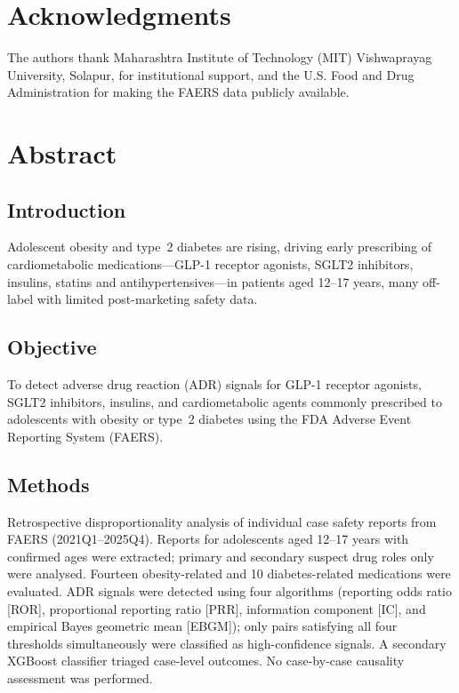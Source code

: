 \documentclass[10pt,a4paper]{article}
\begin{document}
\section*{Acknowledgments}
The authors thank Maharashtra Institute of Technology (MIT) Vishwaprayag University, Solapur, for institutional support, and the U.S. Food and Drug Administration for making the FAERS data publicly available.

\section*{Abstract}

\subsection*{Introduction}
Adolescent obesity and type~2 diabetes are rising, driving early prescribing of cardiometabolic medications---GLP-1 receptor agonists, SGLT2 inhibitors, insulins, statins and antihypertensives---in patients aged 12--17 years, many off-label with limited post-marketing safety data.

\subsection*{Objective}
To detect adverse drug reaction (ADR) signals for GLP-1 receptor agonists, SGLT2 inhibitors, insulins, and cardiometabolic agents commonly prescribed to adolescents with obesity or type~2 diabetes using the FDA Adverse Event Reporting System (FAERS).

\subsection*{Methods}
Retrospective disproportionality analysis of individual case safety reports from FAERS (2021Q1--2025Q4). Reports for adolescents aged 12--17 years with confirmed ages were extracted; primary and secondary suspect drug roles only were analysed. Fourteen obesity-related and 10 diabetes-related medications were evaluated. ADR signals were detected using four algorithms (reporting odds ratio [ROR], proportional reporting ratio [PRR], information component [IC], and empirical Bayes geometric mean [EBGM]); only pairs satisfying all four thresholds simultaneously were classified as high-confidence signals. A secondary XGBoost classifier triaged case-level outcomes. No case-by-case causality assessment was performed.
\end{document}

